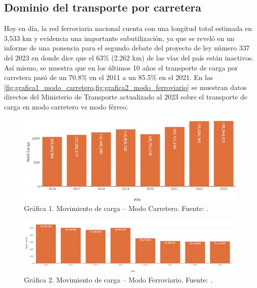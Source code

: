\subsection{Dominio del transporte por carretera}

Hoy en día, la red ferroviaria nacional cuenta con una longitud total estimada en 3{,}533 km \autocite{ponencia337_2023} y evidencia una importante subutilización, ya que se reveló en un informe de una ponencia para el segundo debate del proyecto de ley número 337 del 2023 \autocite{ponencia337_2023} en donde dice que el 63\% (2.262 km) de las vías del país están inactivos. Así mismo, se muestra que en los últimos 10 años el transporte de carga por carretera pasó de un 70.8\% en el 2011 a un 85.5\% en el 2021. En las \cref{fig:grafica1_modo_carretero,fig:grafica2_modo_ferroviario} se muestran datos directos del Ministerio de Transporte actualizado al 2023 sobre el transporte de carga en modo carretero vs modo férreo:

\begin{figure}[H]\centering
  \includegraphics[width=\linewidth]{figures/grafica1_modo_carretero.jpg}
  \caption{Gráfica 1. Movimiento de carga -- Modo Carretero. Fuente: \autocite{mintransporteDatosCarga}.}
  \label{fig:grafica1_modo_carretero}
\end{figure}

\begin{figure}[H]\centering
  \includegraphics[width=\linewidth]{figures/grafica2_modo_ferroviario.jpg}
  \caption{Gráfica 2. Movimiento de carga -- Modo Ferroviario. Fuente: \autocite{mintransporteDatosCarga}.}
  \label{fig:grafica2_modo_ferroviario}
\end{figure}

